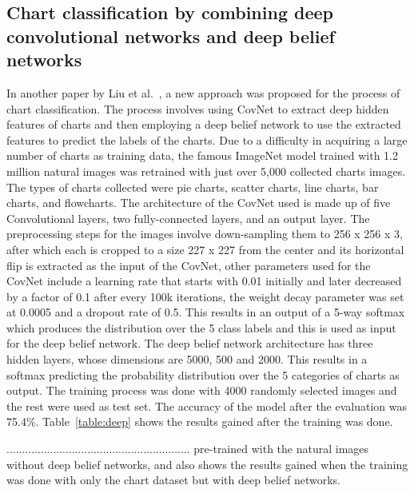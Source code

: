 \documentclass[12pt, a4paper,oneside]{report}
\begin{document}
\subsection{Chart classification by combining deep convolutional networks and deep belief networks}
In another paper by Liu et al.~\cite{liu2015chart}, a new approach was proposed for the process of chart classification. The process involves using CovNet to extract deep hidden features of charts and then employing a deep belief network to use the extracted features to predict the labels of the charts. Due to a difficulty in acquiring a large number of charts as training data, the famous ImageNet model trained with 1.2 million natural images was retrained with just over 5,000 collected charts images. The types of charts collected were pie charts, scatter charts, line charts, bar charts, and flowcharts. The architecture of the CovNet used is made up of five Convolutional layers, two fully-connected layers, and an output layer. The preprocessing steps for the images involve down-sampling them to 256 x 256 x 3, after which each is cropped to a size 227 x 227 from the center and its horizontal flip is extracted as the input of the CovNet, other parameters used for the CovNet include a learning rate that starts with 0.01 initially and later decreased by a factor of 0.1 after every 100k iterations, the weight decay parameter was set at 0.0005 and a dropout rate of 0.5. This results in an output of a 5-way softmax which produces the distribution over the 5 class labels and this is used as input for the deep belief network. The deep belief network architecture has three hidden layers, whose dimensions are 5000, 500 and 2000. This results in a softmax predicting the probability distribution over the 5 categories of charts as output. The training process was done with 4000 randomly selected images and the rest were used as test set. The accuracy of the model after the evaluation was 75.4\%. Table~\ref{table:deep} shows the results gained after the training was done.

...........................................................
pre-trained with the natural images without deep belief networks, and also shows the results gained when the training was done with only the chart dataset but with deep belief networks.
\end{document}
